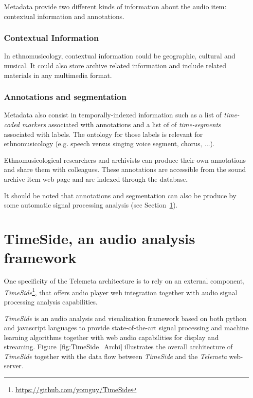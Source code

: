 \documentclass{paper}
\begin{document}
Metadata provide two different kinds of information about the audio item: contextual information and annotations.


\subsubsection{Contextual Information}
In ethnomusicology, contextual information could be geographic, cultural and musical. It could also store archive related information and include related materials in any multimedia format.

\subsubsection{Annotations and segmentation}
Metadata also consist in temporally-indexed information such as a list of \emph{time-coded markers} associated with annotations and a list of of \emph{time-segments} associated with labels. The ontology for those labels is relevant for ethnomusicology (e.g. speech versus singing voice segment, chorus, ...).

Ethnomusicological researchers and archivists can produce their own annotations and share them with colleagues. These annotations are accessible from the sound archive item web page and are indexed through the database.

It should be noted that annotations and segmentation can also be produce by some automatic signal processing analysis (see Section~\ref{sec:Timeside}).




\section{TimeSide, an audio analysis framework}\label{sec:Timeside}
One specificity of the Telemeta architecture is to rely on an external component, \emph{TimeSide}\footnote{\url{https://github.com/yomguy/TimeSide}}, that offers audio player web integration together with audio signal processing analysis capabilities. 

\emph{TimeSide} is an audio analysis and visualization framework based on both python and javascript languages to provide state-of-the-art signal processing and machine learning algorithms together with web audio capabilities for display and streaming.
Figure~\ref{fig:TimeSide_Archi} illustrates the overall architecture of \emph{TimeSide} together with the data flow between \emph{TimeSide} and the \emph{Telemeta} web-server.
\end{document}
